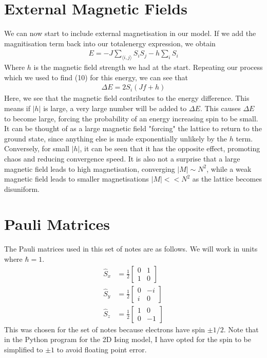 \documentclass{article}
\newcommand{\la}{\langle}
\newcommand{\ra}{\rangle}
\begin{document}
\section{External Magnetic Fields}
We can now start to include external magnetisation in our model. If we add the magnitisation 
term back into our totalenergy expression, we obtain 
\begin{align}
    E=-J\sum_{\la i,j\ra}S_iS_j-h\sum_iS_i
\end{align}
Where $h$ is the magnetic field strength we had at the start. Repeating our process which we used to find (10) for this energy, 
we can see that 
\begin{align}
    \Delta E=2S_i(Jf+h)
\end{align}
Here, we see that the magnetic field contributes to the energy difference. This means 
if $|h|$ is large, a very large number will be added to $\Delta E$. 
This causes $\Delta E$ to become large, forcing the probability of an energy increasing spin to be small. It can 
be thought of as a large magnetic field "forcing" the lattice to return to the ground state, 
since anything else is made exponentially unlikely by the $h$ term. Conversely, for small $|h|$, it can be seen that 
it has the opposite effect, promoting chaos and reducing convergence speed. It is also not a surprise that 
a large magnetic field leads to high magnetisation, converging $|M| \sim  N^2$, while a weak magnetic 
field leads to smaller magnetisations $|M|<<N^2$ as the lattice becomes disuniform.  

\section{Pauli Matrices}
The Pauli matrices used in this set of notes are as follows. We will work in units where $\hbar=1$. 
\begin{align*}
    \hat{S}_x&=\frac{1}{2}\begin{bmatrix}
        0 & 1\\ 
        1& 0
    \end{bmatrix}\\
    \hat{S}_y &= \frac{1}{2}
    \begin{bmatrix}
        0 & -i \\
        i & 0
    \end{bmatrix}\\ 
    \hat{S}_z&=\frac{1}{2}\begin{bmatrix}
        1 & 0\\ 
        0 & -1
    \end{bmatrix}
\end{align*}
This was chosen for the set of notes because electrons have spin $\pm1/2$. 
Note that in the Python program for the 2D Ising model, I have opted for the 
spin to be simplified to $\pm1$ to avoid floating point error. 
\end{document}
